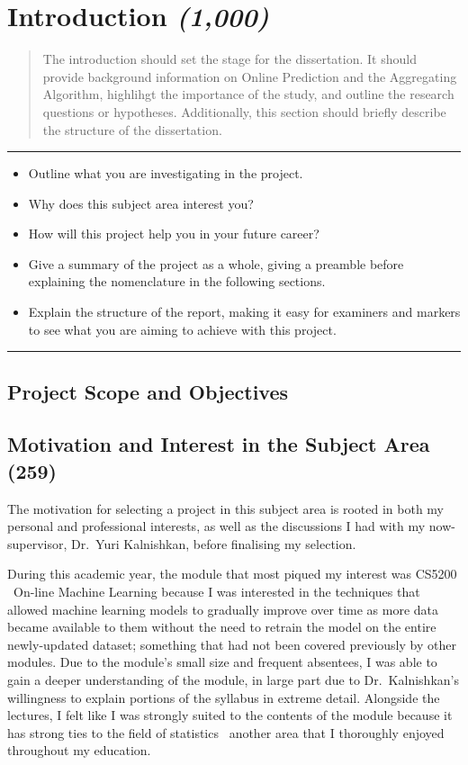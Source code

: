 \section{Introduction \textit{(1,000)}}\label{section:Introduction}

\begin{quote}
    The introduction should set the stage for the dissertation. It should provide background information on Online Prediction and the Aggregating Algorithm, highlihgt the importance of the study, and outline the research questions or hypotheses. Additionally, this section should briefly describe the structure of the dissertation.
\end{quote}

\noindent\rule{\textwidth}{0.1pt}

\begin{itemize}
    \item Outline what you are investigating in the project.
    \item Why does this subject area interest you?
    \item How will this project help you in your future career?
    \item Give a summary of the project as a whole, giving a preamble before explaining the nomenclature in the following sections.
    \item Explain the structure of the report, making it easy for examiners and markers to see what you are aiming to achieve with this project.
\end{itemize}

\noindent\rule{\textwidth}{0.1pt}

\subsection{Project Scope and Objectives}


\subsection{Motivation and Interest in the Subject Area \textbf{(259)}}
The motivation for selecting a project in this subject area is rooted in both my personal and professional interests, as well as the discussions I had with my now-supervisor, Dr.\ Yuri Kalnishkan, before finalising my selection.

During this academic year, the module that most piqued my interest was CS5200 \textendash\ On-line Machine Learning because I was interested in the techniques that allowed machine learning models to gradually improve over time as more data became available to them without the need to retrain the model on the entire newly-updated dataset; something that had not been covered previously by other modules. Due to the module's small size and frequent absentees, I was able to gain a deeper understanding of the module, in large part due to Dr.\ Kalnishkan's willingness to explain portions of the syllabus in extreme detail. Alongside the lectures, I felt like I was strongly suited to the contents of the module because it has strong ties to the field of statistics \textendash\ another area that I thoroughly enjoyed throughout my education. 

